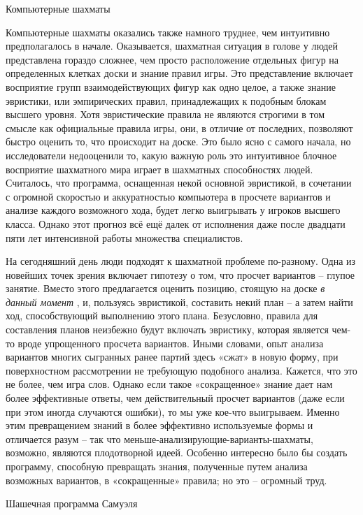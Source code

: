 \documentclass[../main.tex]{subfiles}
\begin{document}
Компьютерные шахматы

Компьютерные шахматы оказались также намного труднее, чем интуитивно предполагалось в начале. Оказывается, шахматная ситуация в голове у людей представлена гораздо сложнее, чем просто расположение отдельных фигур на определенных клетках доски и знание правил игры. Это представление включает восприятие групп взаимодействующих фигур как одно целое, а также знание эвристики, или эмпирических правил, принадлежащих к подобным блокам высшего уровня. Хотя эвристические правила не являются строгими в том смысле как официальные правила игры, они, в отличие от последних, позволяют быстро оценить то, что происходит на доске. Это было ясно с самого начала, но исследователи недооценили то, какую важную роль это интуитивное блочное восприятие шахматного мира играет в шахматных способностях людей. Считалось, что программа, оснащенная некой основной эвристикой, в сочетании с огромной скоростью и аккуратностью компьютера в просчете вариантов и анализе каждого возможного хода, будет легко выигрывать у игроков высшего класса. Однако этот прогноз всё ещё далек от исполнения даже после двадцати пяти лет интенсивной работы множества специалистов.

На сегодняшний день люди подходят к шахматной проблеме по-разному. Одна из новейших точек зрения включает гипотезу о том, что просчет вариантов \--- глупое занятие. Вместо этого предлагается оценить позицию, стоящую на доске \emph{в данный момент} , и, пользуясь эвристикой, составить некий план \--- а затем найти ход, способствующий выполнению этого плана. Безусловно, правила для составления планов неизбежно будут включать эвристику, которая является чем-то вроде упрощенного просчета вариантов. Иными словами, опыт анализа вариантов многих сыгранных ранее партий здесь «сжат» в новую форму, при поверхностном рассмотрении не требующую подобного анализа. Кажется, что это не более, чем игра слов. Однако если такое «сокращенное» знание дает нам более эффективные ответы, чем действительный просчет вариантов (даже если при этом иногда случаются ошибки), то мы уже кое-что выигрываем. Именно этим превращением знаний в более эффективно используемые формы и отличается разум \--- так что меньше-анализирующие-варианты-шахматы, возможно, являются плодотворной идеей. Особенно интересно было бы создать программу, способную превращать знания, полученные путем анализа возможных вариантов, в «сокращенные» правила; но это \--- огромный труд.

Шашечная программа Самуэля
\end{document}

